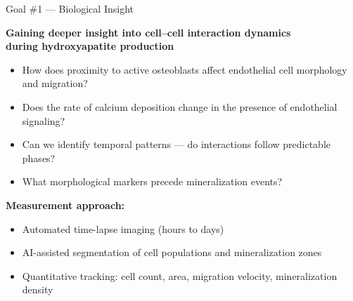 \documentclass[aspectratio=169,11pt]{beamer}
\begin{document}
\begin{frame}{Goal \#1 --- Biological Insight}

  \textbf{Gaining deeper insight into cell--cell interaction dynamics\\ during hydroxyapatite production}

  \vspace{0.5em}

  \begin{itemize}
    \item How does proximity to active osteoblasts affect endothelial cell morphology and migration?
    \item Does the rate of calcium deposition change in the presence of endothelial signaling?
    \item Can we identify temporal patterns --- do interactions follow predictable phases?
    \item What morphological markers precede mineralization events?
  \end{itemize}

  \vfill
  \textbf{Measurement approach:}
  \begin{itemize}
    \item Automated time-lapse imaging (hours to days)
    \item AI-assisted segmentation of cell populations and mineralization zones
    \item Quantitative tracking: cell count, area, migration velocity, mineralization density
  \end{itemize}

\end{frame}
\end{document}
